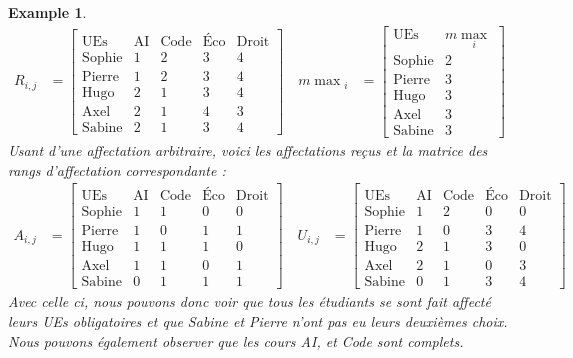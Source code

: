 \documentclass{rapport}
\theoremstyle{definition}
\theoremstyle{remark}
\theoremstyle{plain}
\newtheorem{example}{Example}
\theoremstyle{definition}
\theoremstyle{remark}
\begin{document}
\begin{example}
    $$
    \begin{aligned}
    R_{i,j} &=
        \begin{bmatrix}
            \text{UEs} & \text{AI} & \text{Code} & \text{Éco} & \text{Droit}\\
            \text{Sophie} & 1 & 2 & 3 & 4\\
            \text{Pierre} & 1 & 2 & 3 & 4\\
            \text{Hugo} & 2 & 1 & 3 & 4\\
            \text{Axel} & 2 & 1 & 4 & 3\\
            \text{Sabine} & 2 & 1 & 3 & 4
        \end{bmatrix}
    \quad
    m\!\max\!_i &=
        \begin{bmatrix}
            \text{UEs} & m\!\max_i\\
            \text{Sophie} & 2\\
            \text{Pierre} & 3\\
            \text{Hugo} & 3\\
            \text{Axel} & 3\\
            \text{Sabine} & 3
        \end{bmatrix}
    \end{aligned}
    $$
    Usant d'une affectation arbitraire, voici les affectations reçus et la matrice des rangs d'affectation correspondante :
    $$
    \begin{aligned}
    A_{i,j} &=
        \begin{bmatrix}
            \text{UEs} & \text{AI} & \text{Code} & \text{Éco} & \text{Droit}\\
            \text{Sophie} & 1 & 1 & 0 & 0\\
            \text{Pierre} & 1 & 0 & 1 & 1\\
            \text{Hugo} & 1 & 1 & 1 & 0\\
            \text{Axel} & 1 & 1 & 0 & 1\\
            \text{Sabine} & 0 & 1 & 1 & 1
        \end{bmatrix}
    \quad
    U_{i,j} &=
        \begin{bmatrix}
            \text{UEs} & \text{AI} & \text{Code} & \text{Éco} & \text{Droit}\\
            \text{Sophie} & 1 & 2 & 0 & 0\\
            \text{Pierre} & 1 & 0 & 3 & 4\\
            \text{Hugo} & 2 & 1 & 3 & 0\\
            \text{Axel} & 2 & 1 & 0 & 3\\
            \text{Sabine} & 0 & 1 & 3 & 4
        \end{bmatrix}
    \end{aligned}
    $$
    Avec celle ci, nous pouvons donc voir que tous les étudiants se sont fait affecté leurs UEs obligatoires et que Sabine et Pierre n'ont pas eu leurs deuxièmes choix.
    Nous pouvons également observer que les cours AI, et Code sont complets.
\end{example}
\end{document}
